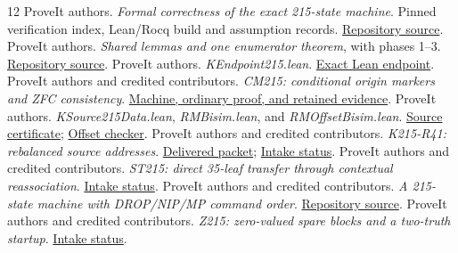 \documentclass[11pt,letterpaper]{article}
\theoremstyle{definition}
\newcommand{\repo}{https://github.com/VladimirReshetnikov/ProveIt/blob/b6c7087477e51c017003bd729e712c8969733223}
\begin{document}
\begin{thebibliography}{12}
 ProveIt authors.
\emph{Formal correctness of the exact 215-state machine}.
Pinned verification index, Lean/Rocq build and assumption records.
\href{\repo/Computability/BusyBeaver/Research/ZFC/k225-formal/verification/k215/README.md}{Repository source}.
 ProveIt authors.
\emph{Shared lemmas and one enumerator theorem}, with phases 1--3.
\href{\repo/Computability/BusyBeaver/Research/ZFC/k225-formal/verification/k215/simplification/phase3/README.md}{Repository source}.
 ProveIt authors.
\emph{KEndpoint215.lean}.
\href{\repo/Computability/BusyBeaver/Lean/BusyBeaver/ZFC/KEndpoint215.lean}{Exact Lean endpoint}.
 ProveIt authors and credited contributors.
\emph{CM215: conditional origin markers and ZFC consistency}.
\href{\repo/Computability/BusyBeaver/Research/ZFC/candidate-k215/alternatives/conditional-marker/README.md}{Machine, ordinary proof, and retained evidence}.
 ProveIt authors.
\emph{KSource215Data.lean}, \emph{RMBisim.lean}, and
\emph{RMOffsetBisim.lean}.
\href{\repo/Computability/BusyBeaver/Lean/BusyBeaver/ZFC/KSource215Data.lean}{Source certificate};
\href{\repo/Computability/BusyBeaver/Lean/BusyBeaver/ZFC/RMOffsetBisim.lean}{Offset checker}.
 ProveIt authors and credited contributors.
\emph{K215-R41: rebalanced source addresses}.
\href{\repo/Computability/BusyBeaver/Research/ZFC/candidate-k215/alternatives/rebalanced/README.md}{Delivered packet};
\href{\repo/Computability/BusyBeaver/Research/ZFC/candidate-k215/alternatives/rebalanced/INTAKE.md}{Intake status}.
 ProveIt authors and credited contributors.
\emph{ST215: direct 35-leaf transfer through contextual reassociation}.
\href{\repo/Computability/BusyBeaver/Research/ZFC/candidate-k215/alternatives/direct-transfer/INTAKE.md}{Intake status}.
 ProveIt authors and credited contributors.
\emph{A 215-state machine with DROP/NIP/MP command order}.
\href{\repo/Computability/BusyBeaver/Research/ZFC/candidate-k215/alternatives/commands120/README.md}{Repository source}.
 ProveIt authors and credited contributors.
\emph{Z215: zero-valued spare blocks and a two-truth startup}.
\href{\repo/Computability/BusyBeaver/Research/ZFC/candidate-k215/alternatives/zero-spare/INTAKE.md}{Intake status}.
\end{thebibliography}
\end{document}
